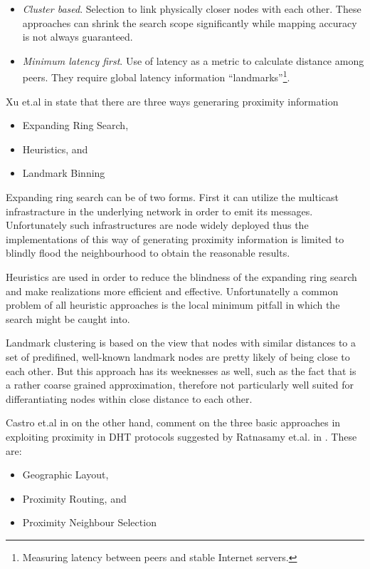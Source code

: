 \documentclass[a4paper,10pt]{article}
\begin{document}
\begin{itemize}
\begin{itemize}
    \item \emph{Cluster based}. Selection to link physically closer nodes with each other. These approaches can shrink the search scope significantly while mapping accuracy is not always guaranteed.
    \item \emph{Minimum latency first}. Use of latency as a metric to calculate distance among peers. They require global latency information ``landmarks''\footnote{Measuring latency between peers and stable Internet servers.}.
  \end{itemize}
\end{itemize}

Xu et.al in \cite{xu_globstate_2003} state that there are three ways generaring proximity information
\begin{itemize}
 \item Expanding Ring Search,
 \item Heuristics, and
 \item Landmark Binning
\end{itemize}

Expanding ring search can be of two forms. First it can utilize the multicast infrastracture in the underlying network in order to emit its messages. Unfortunately such infrastructures are node widely deployed thus the implementations of this way of generating proximity information is limited to blindly flood the neighbourhood to obtain the reasonable results.

Heuristics are used in order to reduce the blindness of the expanding ring search and make realizations more efficient and effective. Unfortunatelly a common problem of all heuristic approaches is the local minimum pitfall in which the search might be caught into.

Landmark clustering is based on the view that nodes with similar distances to a set of predifined, well-known landmark nodes are pretty likely of being close to each other. But this approach has its weeknesses as well, such as the fact that is a rather coarse grained approximation, therefore not particularly well suited for differantiating nodes within close distance to each other.

Castro et.al in \cite{castro_proximitydht_2002, castro_topawareroute_2002} on the other hand, comment on the three basic approaches in exploiting proximity in DHT protocols suggested by Ratnasamy et.al. in \cite{ratnasamy_openq_2002}. These are:
\begin{itemize}
 \item Geographic Layout,
 \item Proximity Routing, and
 \item Proximity Neighbour Selection
\end{itemize}
\end{document}
